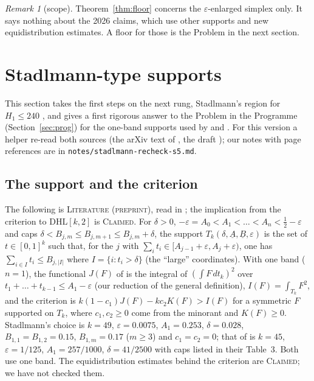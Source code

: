 \documentclass[11pt]{amsart}
\theoremstyle{definition}
\theoremstyle{remark}
\newtheorem{remark}[theorem]{Remark}
\newcommand{\lbl}[1]{\textup{\textsc{#1}}}
\newcommand{\DHL}{\mathrm{DHL}}
\begin{document}
\begin{remark}[scope]
Theorem~\ref{thm:floor} concerns the $\varepsilon$-enlarged simplex only. It
says nothing about the 2026 claims, which use other supports and new
equidistribution estimates. A floor for those is the Problem in the next
section.
\end{remark}

\section{Stadlmann-type supports}\label{sec:stad}

This section takes the first steps on the next rung, Stadlmann's region for
$H_1\le240$ \cite{Sta26}, and gives a first rigorous answer to the Problem in
the Programme (Section~\ref{sec:prog}) for the one-band supports used by \cite{Sta26} and \cite{Cha26}.
For this version a helper re-read both sources (the arXiv text of
\cite{Sta26}, the draft \cite{Cha26}); our notes with page references are in
\texttt{notes/stadlmann-recheck-s5.md}.

\subsection*{The support and the criterion}
The following is \lbl{Literature (preprint)}, read in \cite[Def.~1, Def.~5,
Prop.~1]{Sta26}; the implication from the criterion to $\DHL[k,2]$ is
\lbl{Claimed}.
For $\delta>0$, $-\varepsilon=A_0<A_1<\dots<A_n<\frac12-\varepsilon$ and caps
$\delta<B_{j,m}\le B_{j,m+1}\le B_{j,m}+\delta$, the support
$T_k(\delta,\underline A,\underline B,\varepsilon)$ is the set of
$t\in[0,1]^k$ such that, for the $j$ with
$\sum_it_i\in[A_{j-1}+\varepsilon,A_j+\varepsilon)$, one has
$\sum_{i\in I}t_i\le B_{j,|I|}$ where $I=\{i:t_i>\delta\}$ (the ``large''
coordinates). With one band ($n=1$), the functional $J(F)$ of \cite{Sta26}
is the integral of $\left(\int F\,dt_k\right)^2$ over
$t_1+\dots+t_{k-1}\le A_1-\varepsilon$ (our reduction of the general
definition), $I(F)=\int_{T_k}F^2$, and the criterion is
$k(1-c_1)J(F)-kc_2K(F)>I(F)$ for a symmetric $F$ supported on $T_k$, where
$c_1,c_2\ge0$ come from the minorant and $K(F)\ge0$. Stadlmann's choice is
$k=49$, $\varepsilon=0.0075$, $A_1=0.253$, $\delta=0.028$,
$B_{1,1}=B_{1,2}=0.15$, $B_{1,m}=0.17$ ($m\ge3$) and $c_1=c_2=0$; that of
\cite{Cha26} is $k=45$, $\varepsilon=1/125$, $A_1=257/1000$,
$\delta=41/2500$ with caps listed in their Table~3. Both use one band. The
equidistribution estimates behind the criterion are \lbl{Claimed}; we have not
checked them.
\end{document}
